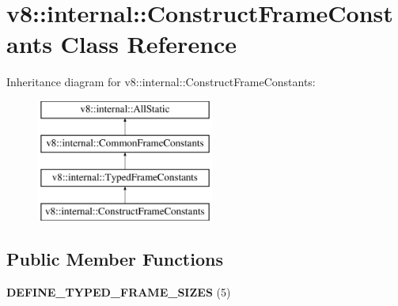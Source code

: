 \hypertarget{classv8_1_1internal_1_1ConstructFrameConstants}{}\section{v8\+:\+:internal\+:\+:Construct\+Frame\+Constants Class Reference}
\label{classv8_1_1internal_1_1ConstructFrameConstants}
Inheritance diagram for v8\+:\+:internal\+:\+:Construct\+Frame\+Constants\+:\begin{figure}[H]
\begin{center}
\leavevmode
\includegraphics[height=4.000000cm]{classv8_1_1internal_1_1ConstructFrameConstants}
\end{center}
\end{figure}
\subsection*{Public Member Functions}
\begin{DoxyCompactItemize}
\item 
\mbox{\label{classv8_1_1internal_1_1ConstructFrameConstants_aedc4f8d1fe154d010aa7a7b43b919be3}} 
{\bfseries D\+E\+F\+I\+N\+E\+\_\+\+T\+Y\+P\+E\+D\+\_\+\+F\+R\+A\+M\+E\+\_\+\+S\+I\+Z\+ES} (5)
\end{DoxyCompactItemize}
